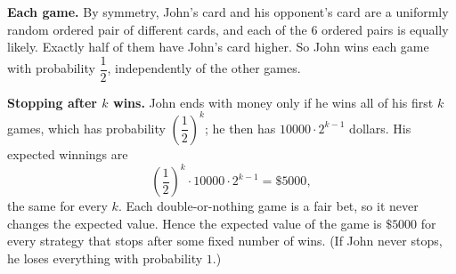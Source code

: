 \textbf{Each game.} By symmetry, John's card and his opponent's card are a uniformly random ordered pair of different cards, and each of the $6$ ordered pairs is equally likely. Exactly half of them have John's card higher. So John wins each game with probability $\dfrac12$, independently of the other games.

\textbf{Stopping after $k$ wins.} John ends with money only if he wins all of his first $k$ games, which has probability $\left(\dfrac12\right)^k$; he then has $10000\cdot2^{k-1}$ dollars. His expected winnings are
\[\left(\dfrac12\right)^k\cdot10000\cdot2^{k-1}=\boxed{\$5000},\]
the same for every $k$. Each double-or-nothing game is a fair bet, so it never changes the expected value. Hence the expected value of the game is $\$5000$ for every strategy that stops after some fixed number of wins. (If John never stops, he loses everything with probability $1$.)
